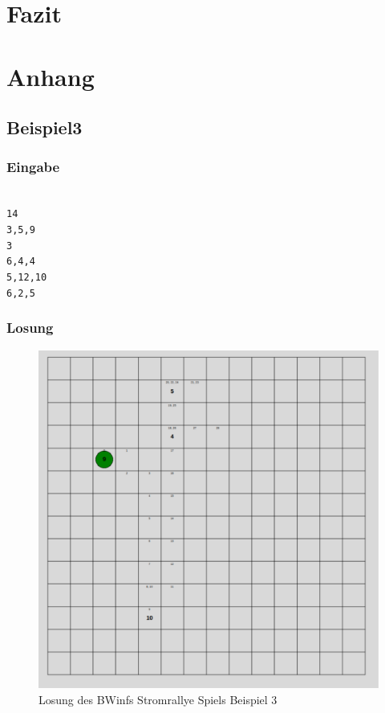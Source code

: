 \documentclass[a4paper,12pt,arial]{scrartcl}
\begin{document}
\section{Fazit}
\section{Anhang}



\subsection{Beispiel3}
\subsubsection{Eingabe}
\texttt{ \\
14 \\
3,5,9 \\
3 \\
6,4,4 \\
5,12,10 \\
6,2,5 \\
}
\subsubsection{Losung}
\begin{figure}[h]
    \centering
    \includegraphics[width=\textwidth]{solution3.pdf}
    \caption{Losung des BWinfs Stromrallye Spiels Beispiel 3}
    \label{fig:loesung3}
\end{figure}
\end{document}
